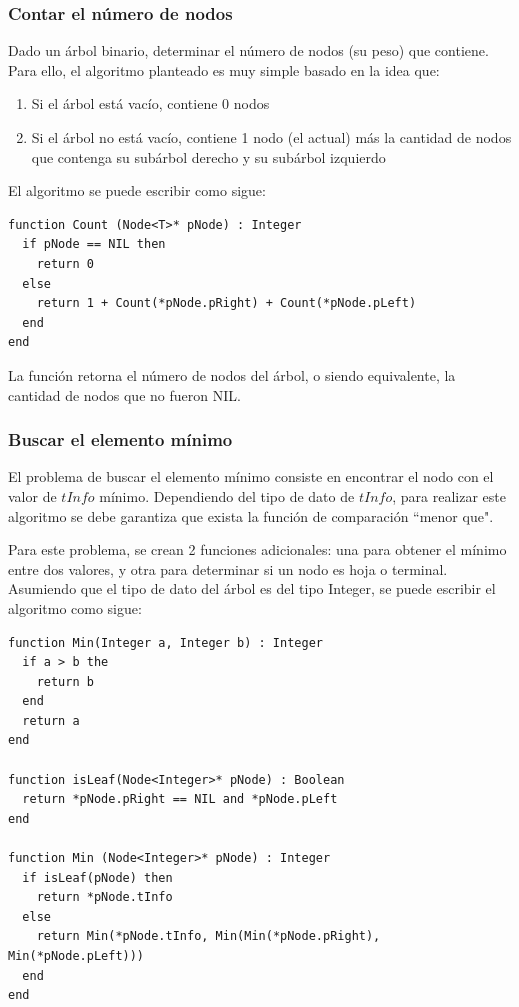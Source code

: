 \subsubsection{Contar el número de nodos}

Dado un árbol binario, determinar el número de nodos (su peso) que contiene. Para ello, el algoritmo planteado es muy simple basado en la idea que:
\begin{enumerate}
\item Si el árbol está vacío, contiene 0 nodos
\item Si el árbol no está vacío, contiene 1 nodo (el actual) más la cantidad de nodos que contenga su subárbol derecho y su subárbol izquierdo
\end{enumerate}

El algoritmo se puede escribir como sigue:

\begin{lstlisting}[upquote=true, language=pseudo]
function Count (Node<T>* pNode) : Integer
  if pNode == NIL then
    return 0
  else
    return 1 + Count(*pNode.pRight) + Count(*pNode.pLeft)
  end
end
\end{lstlisting}

La función retorna el número de nodos del árbol, o siendo equivalente, la cantidad de nodos que no fueron NIL.


\subsubsection{Buscar el elemento mínimo}

El problema de buscar el elemento mínimo consiste en encontrar el nodo con el valor de $tInfo$ mínimo. Dependiendo del tipo de dato de $tInfo$, para realizar este algoritmo se debe garantiza que exista la función de comparación ``menor que".

Para este problema, se crean 2 funciones adicionales: una para obtener el mínimo entre dos valores, y otra para determinar si un nodo es hoja o terminal. Asumiendo que el tipo de dato del árbol es del tipo Integer, se puede escribir el algoritmo como sigue:

\begin{lstlisting}[upquote=true, language=pseudo]
function Min(Integer a, Integer b) : Integer
  if a > b the
    return b
  end
  return a
end

function isLeaf(Node<Integer>* pNode) : Boolean
  return *pNode.pRight == NIL and *pNode.pLeft
end

function Min (Node<Integer>* pNode) : Integer
  if isLeaf(pNode) then
    return *pNode.tInfo
  else
    return Min(*pNode.tInfo, Min(Min(*pNode.pRight), Min(*pNode.pLeft)))
  end
end
\end{lstlisting}

